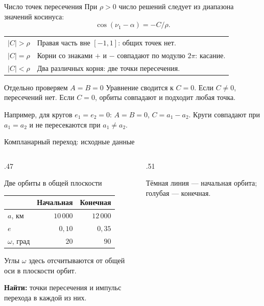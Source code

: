 \documentclass[11pt,aspectratio=169,t]{beamer}
\begin{document}
\begin{frame}{Число точек пересечения}
При $\rho>0$ число решений следует из диапазона значений косинуса:
\[
\cos(\nu_1-\alpha)=-C/\rho.
\]
\renewcommand{\arraystretch}{1.2}
\begin{tabularx}{.99\textwidth}{@{}lX@{}}
$|C|>\rho$ & Правая часть вне $[-1,1]$: общих точек нет.\\
$|C|=\rho$ & Корни со знаками $+$ и $-$ совпадают по модулю $2\pi$: касание.\\
$|C|<\rho$ & Два различных корня: две точки пересечения.\\
\end{tabularx}
\begin{block}{Отдельно проверяем $A=B=0$}
\justifying
Уравнение сводится к $C=0$. Если $C\ne0$, пересечений нет.
Если $C=0$, орбиты совпадают и подходит любая точка.
\end{block}
\justifying
Например, для кругов $e_1=e_2=0$: $A=B=0$, $C=a_1-a_2$.
Круги совпадают при $a_1=a_2$ и не пересекаются при $a_1\ne a_2$.
\end{frame}

\begin{frame}{Компланарный переход: исходные данные}
\begin{columns}[T,onlytextwidth]
\begin{column}{.47\textwidth}
\begin{block}{Две орбиты в общей плоскости}
\centering
\renewcommand{\arraystretch}{1.18}
\begin{tabular}{@{}lrr@{}}
 & Начальная & Конечная\\\midrule
$a$, км & $10\,000$ & $12\,000$\\
$e$ & $0{,}10$ & $0{,}35$\\
$\omega$, град & $20$ & $90$
\end{tabular}
\end{block}
\justifying
Углы $\omega$ здесь отсчитываются от общей оси в плоскости орбит.
\par\medskip
\textbf{Найти:} точки пересечения и импульс перехода в каждой из них.
\end{column}
\begin{column}{.51\textwidth}
\centering\par
{\color{coursemuted}
Тёмная линия --- начальная орбита; голубая --- конечная.\par}
\end{column}
\end{columns}
\end{frame}
\end{document}
